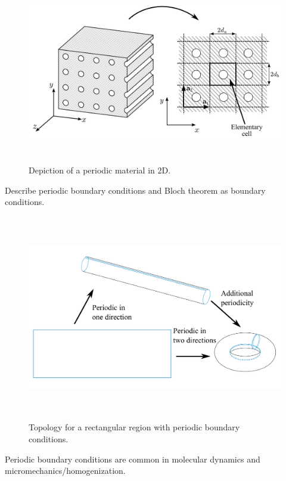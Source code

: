 \begin{figure}[h]
\centering
\includegraphics[height=8cm]{periodic_2D.pdf} 
\caption{Depiction of a periodic material in 2D.}
\label{fig:periodic_2D}
\end{figure}

 Describe periodic boundary conditions and Bloch theorem as boundary conditions.

\begin{figure}[h]
\centering
\includegraphics[height=9cm]{periodic_topology.pdf} 
\caption{Topology for a rectangular region with periodic boundary conditions.}
\label{fig:periodic_topo}
\end{figure}

Periodic boundary conditions are common in molecular dynamics and micromechanics/homogenization.

